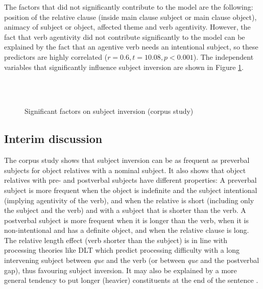 \documentclass[output=paper]{langscibook}
\begin{document}
The factors that did not significantly contribute to the model are the
following: position of the relative clause (inside main clause subject
or main clause object), animacy of subject or object, affected theme
and verb agentivity. However, the fact that verb agentivity did not
contribute significantly to the model can be explained by the fact
that an agentive verb needs an intentional subject, so these
predictors are highly correlated ($r=0.6, t=10.08, p<0.001$). The independent
variables that significantly influence subject inversion are
shown in Figure \ref{figcorpus}.

\begin{figure}
\\
\\
\caption{Significant factors on subject inversion (corpus study)\label{figcorpus}}
\end{figure}

\subsection{Interim discussion}


The corpus study shows that subject inversion can be as frequent as preverbal subjects for object relatives with a nominal subject. It also shows that object relatives with pre- and postverbal subjects have different properties: A preverbal subject is more frequent when the object is indefinite and  the subject intentional (implying agentivity of the verb), and  when the relative is short (including only the subject and the verb) and with a subject that is shorter than the verb.  A postverbal subject is more frequent when it is longer than the verb, when it is non-intentional and has a definite object, and when the relative clause is long. 
The relative length effect (verb shorter than the subject) is in line with processing theories like DLT which predict processing difficulty with a long intervening subject between {\textit{que}} and the verb (or between {\textit{que}} and the postverbal gap), thus favouring subject inversion. It may also be explained by a more general tendency to put longer (heavier) constituents at the end of the sentence  \citep{Behaghel, wasow2002postverbal}. 
\end{document}
